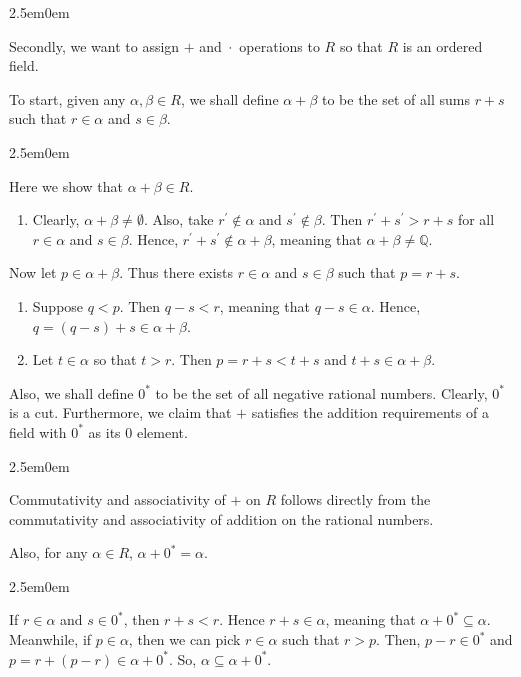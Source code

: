 \documentclass{book}
\newcommand{\exTwo}{%
\color{Purple}%
   \fontsize{13}{15}\selectfont%
}
\newenvironment{myIndent}{%
   \begin{adjustwidth}{2.5em}{0em}%
}{%
   \end{adjustwidth}%
}
\newcommand{\myHS}{ \hspace{0.5em}}
\newcommand{\retTwo}{\hfill\bigbreak}
\begin{document}
\begin{myIndent}
      Secondly, we want to assign $+$ and $\hspace{0.1em}\cdot\hspace{0.1em}$ operations to $R$ so that $R$ is an ordered field.\retTwo
      
      To start, given any $\alpha, \beta \in R$, we shall define $\alpha + \beta$ to be the set of all sums $r + s$ such that $r \in \alpha$ and $s \in \beta$.
      \begin{myIndent}\exTwo
         Here we show that $\alpha + \beta \in R$.
         \begin{enumerate}
            \item Clearly, $\alpha + \beta \neq \emptyset$. Also, take $r^\prime \notin \alpha$ and $s^\prime \notin \beta$. Then $r^\prime + s^\prime > r + s$ for all $r \in \alpha$ and $s \in \beta$. Hence, $r^\prime + s^\prime \notin \alpha + \beta$, meaning that $\alpha + \beta \neq \mathbb{Q}$.\\ [-9pt]
         \end{enumerate}

         Now let $p \in \alpha + \beta$. Thus there exists $r \in \alpha$ and $s \in \beta$ such that $p = r + s$.\\ [-9pt]

         \begin{enumerate}
            \item[2.] Suppose $q < p$. Then $q - s < r$, meaning that $q - s \in \alpha$. Hence,\\ $q = (q - s) + s \in \alpha + \beta$.\retTwo
            
            \item[3.] Let $t \in \alpha$ so that $t > r$. Then $p = r + s < t + s$ and $t + s \in \alpha + \beta$.\retTwo
         \end{enumerate}
      \end{myIndent}

      Also, we shall define $0^*$ to be the set of all negative rational numbers. Clearly, $0^*$ is a cut. Furthermore, we claim that $+$ satisfies the addition requirements of a field with $0^*$ as its $0$ element.

      \begin{myIndent}\exTwo
         Commutativity and associativity of $+$ on $R$ follows directly from the\\ commutativity and associativity of addition on the rational numbers.\retTwo

         Also, for any $\alpha \in R$,\myHS $\alpha + 0^* = \alpha$.
         \begin{myIndent}
            If $r \in \alpha$ and $s \in 0^*$, then $r + s < r$. Hence $r + s \in \alpha$, meaning that $\alpha + 0^* \subseteq \alpha$. Meanwhile, if $p \in \alpha$, then we can pick $r \in \alpha$ such that $r > p$. Then, $p - r \in 0^*$ and $p = r + (p - r) \in \alpha + 0^*$. So, $\alpha \subseteq \alpha + 0^*$.\retTwo
         \end{myIndent}


\end{myIndent}
\end{myIndent}
\end{document}
